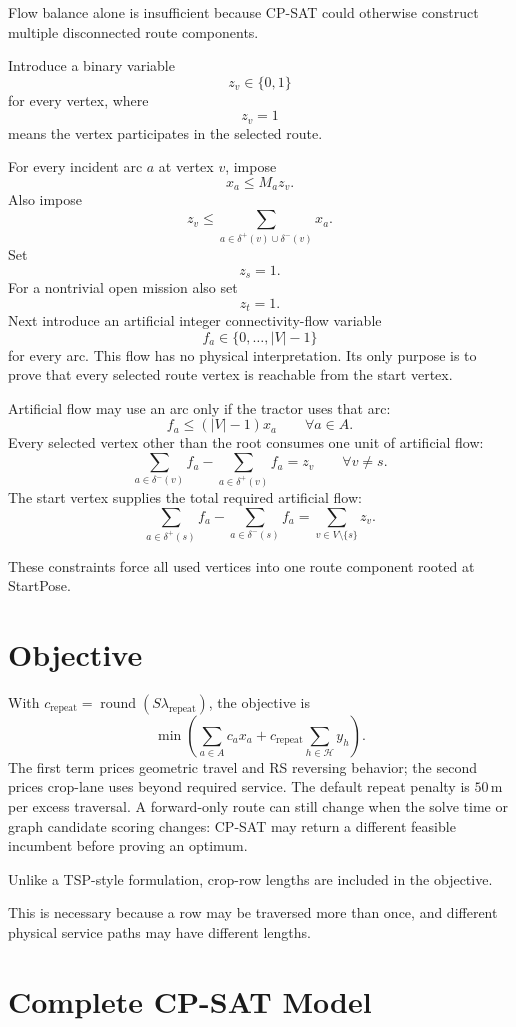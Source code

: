 \documentclass{article}
\begin{document}
Flow balance alone is insufficient because CP-SAT could otherwise construct multiple disconnected route components.

Introduce a binary variable
$$
z_v\in\{0,1\}
$$
for every vertex, where
$$
z_v=1
$$
means the vertex participates in the selected route.

For every incident arc $a$ at vertex $v$, impose
$$
x_a \leq M_a z_v.
$$
Also impose
$$
z_v
\leq
\sum_{a\in\delta^+(v)\cup\delta^-(v)}x_a.
$$
Set
$$
z_s=1.
$$
For a nontrivial open mission also set
$$
z_t=1.
$$
Next introduce an artificial integer connectivity-flow variable
$$
f_a\in\{0,\ldots,|V|-1\}
$$
for every arc.
This flow has no physical interpretation. Its only purpose is to prove that every selected route vertex is reachable from the start vertex.

Artificial flow may use an arc only if the tractor uses that arc:
$$
f_a
\leq
(|V|-1)x_a
\qquad
\forall a\in A.
$$
Every selected vertex other than the root consumes one unit of artificial flow:
$$
\sum_{a\in\delta^-(v)}f_a
-
\sum_{a\in\delta^+(v)}f_a
=
z_v
\qquad
\forall v\neq s.
$$
The start vertex supplies the total required artificial flow:
$$
\sum_{a\in\delta^+(s)}f_a
-
\sum_{a\in\delta^-(s)}f_a
=
\sum_{v\in V\setminus\{s\}}z_v.
$$

These constraints force all used vertices into one route component rooted at StartPose.

\section{Objective}

With $c_{\mathrm{repeat}}=\operatorname{round}(S\lambda_{\mathrm{repeat}})$, the objective is
$$
\min
\left(
\sum_{a\in A}c_a x_a
+c_{\mathrm{repeat}}\sum_{h\in\mathcal{H}}y_h
\right).
$$
The first term prices geometric travel and RS reversing behavior; the second prices crop-lane uses beyond required service. The default repeat penalty is $50\,$m per excess traversal. A forward-only route can still change when the solve time or graph candidate scoring changes: CP-SAT may return a different feasible incumbent before proving an optimum.

Unlike a TSP-style formulation, crop-row lengths are included in the objective.

This is necessary because a row may be traversed more than once, and different physical service paths may have different lengths.

\section{Complete CP-SAT Model}
\end{document}
